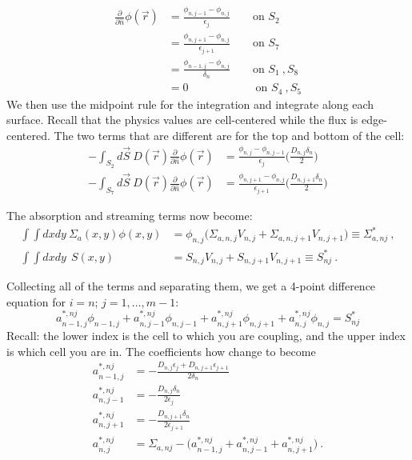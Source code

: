 \documentclass[12pt]{article}
\begin{document}
\begin{align}
\frac{\partial}{\partial \hat{n}}\phi(\vec{r}) &= \frac{\phi_{n,j-1} - \phi_{n,j}}{\epsilon_j} \qquad \text{on } S_2  \nonumber \\
%
&= \frac{\phi_{n,j+1} - \phi_{n,j}}{\epsilon_{j+1}} \qquad \text{on } S_7 \nonumber \\
%
&= \frac{\phi_{n-1,j} - \phi_{n,j}}{\delta_{n}} \qquad \text{on } S_1 \:, S_8 \nonumber \\
%
&= 0 \qquad \qquad \qquad \text{on } S_4 \:, S_5 \nonumber 
\end{align}
%
We then use the midpoint rule for the integration and integrate along each surface. Recall that the physics values are cell-centered while the flux is edge-centered. The two terms that are different are for the top and bottom of the cell:
%
\begin{align}
- \int_{S_2} d\vec{S} \:D(\vec{r})\frac{\partial}{\partial \hat{n}}\phi(\vec{r}) &= \frac{\phi_{n,j} - \phi_{n,j-1}}{\epsilon_{j}} \biggl(\frac{D_{n,j} \delta_{n}}{2}\biggr) \nonumber \\ 
%
- \int_{S_7} d\vec{S} \:D(\vec{r})\frac{\partial}{\partial \hat{n}}\phi(\vec{r}) &= \frac{\phi_{n,j+1} - \phi_{n,j}}{\epsilon_{j+1}} \biggl(\frac{D_{n,j+1} \delta_{n}}{2}\biggr) \nonumber
\end{align}

The absorption and streaming terms now become:
\begin{align}
\int \int dx dy\:\Sigma_a(x,y) \phi(x,y) &= \boxed{\phi_{n,j}\bigl(\Sigma_{a,n,j} V_{n,j} + \Sigma_{a,n,j+1} V_{n,j+1} \bigr) \equiv \Sigma^*_{a,nj}}\:, \nonumber \\
%
\int \int dx dy \: \:S(x,y) &= \boxed{S_{n,j} V_{n,j} + S_{n,j+1} V_{n,j+1} \equiv S^*_{nj}}\:. \nonumber
\end{align}

\vspace*{2em}
Collecting all of the terms and separating them, we get a 4-point difference equation for $i=n$; $j=1,\dots,m-1$:
%
\[\boxed{a_{n-1,j}^{*,nj}\phi_{n-1,j} + a_{n,j-1}^{*,nj}\phi_{n,j-1} + a_{n,j+1}^{*,nj}\phi_{n,j+1} +  a_{n,j}^{*,nj}\phi_{n,j} = S^*_{nj}} \]
%
Recall: the lower index is the cell to which you are coupling, and the upper index is which cell you are in. The coefficients how change to become
%
\begin{align}
a_{n-1,j}^{*,nj} &= -\frac{D_{n,j} \epsilon_{j} + D_{n,j+1} \epsilon_{j+1}}{2 \delta_{n}}  \nonumber \\
%
a_{n,j-1}^{*,nj} &= -\frac{D_{n,j} \delta_{n}}{2 \epsilon_{j}}  \nonumber \\
%
a_{n,j+1}^{*,nj} &= -\frac{D_{n,j+1} \delta_{n}}{2 \epsilon_{j+1}}  \nonumber \\
%
a_{n,j}^{*,nj} &= \Sigma_{a,nj} - \bigl(a_{n-1,j}^{*,nj} + a_{n,j-1}^{*,nj} + a_{n,j+1}^{*,nj} \bigr)
 \:.\nonumber
\end{align}
\end{document}
